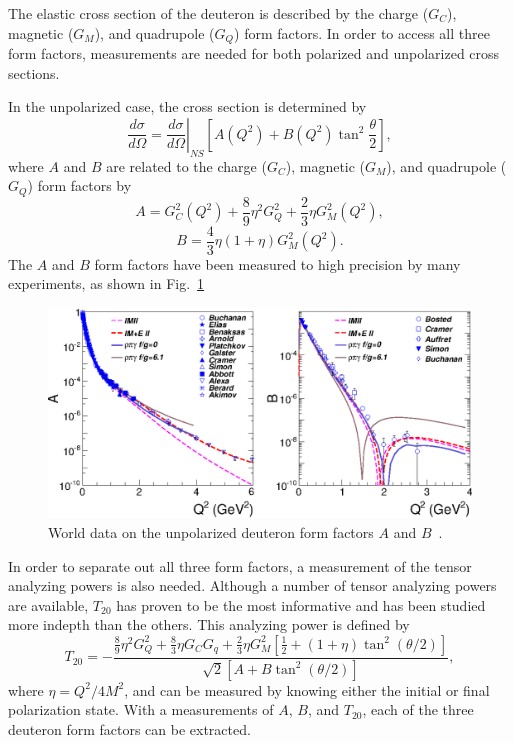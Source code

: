 
The elastic cross section of the deuteron is described by the charge ($G_C$), magnetic ($G_M$), and quadrupole ($G_Q$) form factors. In order to access all three form factors, measurements are needed for both polarized and unpolarized cross sections. 

In the unpolarized case, the cross section is determined by
\begin{equation}
\frac{d\sigma}{d\Omega} = \left. \frac{d\sigma}{d\Omega}\right\vert_{NS}\left[A(Q^2)  + B(Q^2)\tan^2\frac{\theta}{2}  \right],
\end{equation}
where $A$ and $B$ are related to the charge ($G_C$), magnetic ($G_M$), and quadrupole ($G_Q$) form factors by
\begin{equation}
A=G_C^2(Q^2)+\frac{8}{9} \eta ^2 G_Q^2 + \frac{2}{3} \eta G_M^2(Q^2),
\end{equation}
\begin{equation}
B=\frac{4}{3}\eta (1+\eta )G_M^2(Q^2).
\end{equation}
The $A$ and $B$ form factors have been measured to high precision by many experiments, as shown in Fig.~\ref{ab-ff}

\begin{figure}
\begin{center}
\includegraphics{figs/ab-ff.eps} 
\caption{\label{ab-ff}World data on the unpolarized deuteron form factors $A$ and $B$~\cite{Holt:2012gg}.}
\end{center}
\end{figure}

In order to separate out all three form factors, a measurement of the tensor analyzing powers is also needed. Although a number of tensor analyzing powers are available, $T_{20}$ has proven to be the most informative and has been studied more indepth than the others. This analyzing power is defined by
\begin{equation}
T_{20} = -\frac{\frac{8}{9}\eta^2 G^2_Q + \frac{8}{3} \eta G_C G_q + \frac{2}{3} \eta G_M^2\left[\frac{1}{2} + (1 + \eta) \tan^2(\theta / 2) \right]}{\sqrt{2} [A + B\tan^2(\theta / 2)]},
\end{equation}
where $\eta=Q^2/4M^2$, and can be measured by knowing either the initial or final polarization state. With a measurements of $A$, $B$, and $T_{20}$, each of the three deuteron form factors can be extracted.


